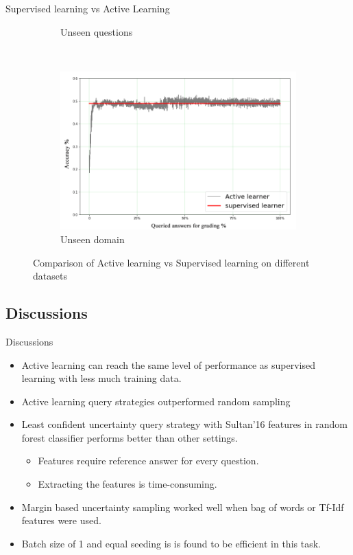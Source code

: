 \documentclass{beamer}
\begin{document}
\begin{frame}{Supervised learning vs Active Learning}
\begin{figure}[!htb]
\begin{subfigure}[b]{0.30\textwidth}
									\caption{Unseen questions}
					\label{mohlerdisagreement}
				\end{subfigure}
				~
				\begin{subfigure}[b]{0.30\textwidth}
					\includegraphics[width=\textwidth]{images/Unseen_Domain}
									\caption{Unseen domain}
					\label{mohlergrades}
				\end{subfigure}
				\caption{Comparison of Active learning vs Supervised learning on different datasets}
			\end{figure}
\end{frame}
\subsection{Discussions}
\begin{frame}{Discussions}
\begin{itemize}
	\item Active learning can reach the same level of performance as supervised learning with less much training data.
	\item Active learning query strategies outperformed random sampling 
	\item Least confident uncertainty query strategy with Sultan'16 features in random forest classifier performs better than other settings.
	\begin{itemize}
		\item Features require reference answer for every question. 
		\item Extracting the features is time-consuming.
	\end{itemize}
	\item Margin based uncertainty sampling worked well when bag of words or Tf-Idf features were used.
	\item Batch size of 1 and equal seeding is is found to be efficient in this task.
	
\end{itemize}	
\end{frame}
\end{document}
